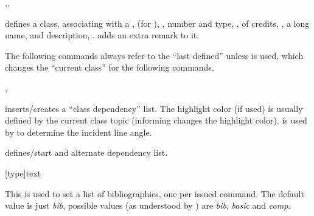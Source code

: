 \documentclass[article,nogeometry,english,tocdepth=3,secdepth=3]{ufrgscca} %
\begin{document}
\begin{codedescribe}{\classdef,\setclass,\classremark}
    \begin{codesyntax}%
    \end{codesyntax}
\tsmacro{\classdef}{} defines a class, associating with a ,  (for ), , number and type, , of credits, , a long name,  and description, . \tsmacro{\classremark}{} adds an extra remark to it.

The following commands always refer to the “last defined” \tsmacro{\classdef}{} unless \tsmacro{\setclass}{} is used, which changes the “current class” for the following commands.
\end{codedescribe}

\begin{codedescribe}{\depdef,\altdef}
    \begin{codesyntax}%
        \tsmacro{\altdef}{}
    \end{codesyntax}
\tsmacro{\depdef}{} inserts/creates a “class dependency” list. The highlight color (if used) is usually defined by the current class topic (informing  changes the highlight color).  is used by  to determine the incident line angle.

\tsmacro{\altdef}{} defines/start and alternate dependency list.
\end{codedescribe}

\begin{codedescribe}{\bibdef}
    \begin{codesyntax}%
        \tsmacro{\bibdef}[type]{text}
    \end{codesyntax}
This is used to set a list of bibliographies, one per issued command. The default  value is just \emph{bib}, possible values (as understood by ) are \emph{bib}, \emph{basic} and \emph{comp}.
\end{codedescribe}
\end{document}
